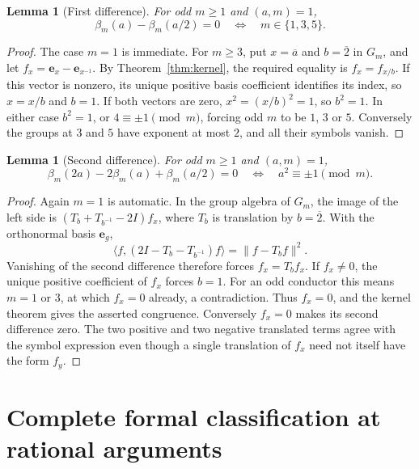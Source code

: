 \documentclass[11pt]{article}
\numberwithin{equation}{section}
\newtheorem{lemma}[theorem]{Lemma}
\theoremstyle{definition}
\theoremstyle{remark}
\newcommand{\ee}{\mathbf e}
\newcommand{\inv}{^{-1}}
\begin{document}
\begin{lemma}[First difference]\label{lem:first}
For odd $m\ge1$ and $(a,m)=1$,
\begin{equation}\label{eq:first}
 \beta_m(a)-\beta_m(a/2)=0
 \quad\Longleftrightarrow\quad m\in\{1,3,5\}.
\end{equation}
\end{lemma}
\begin{proof}
The case $m=1$ is immediate. For $m\ge3$, put $x=\overline a$ and
$b=\overline2$ in $G_m$, and let $f_x=\ee_x-\ee_{x\inv}$.
By Theorem~\ref{thm:kernel}, the required equality is
$f_x=f_{x/b}$. If this vector is nonzero, its unique positive basis
coefficient identifies its index, so $x=x/b$ and $b=1$. If both
vectors are zero, $x^2=(x/b)^2=1$, so $b^2=1$. In either case
$b^2=1$, or $4\equiv\pm1\pmod m$, forcing odd $m$ to be $1$, $3$
or $5$. Conversely the groups at $3$ and $5$ have exponent at most
$2$, and all their symbols vanish.
\end{proof}

\begin{lemma}[Second difference]\label{lem:second}
For odd $m\ge1$ and $(a,m)=1$,
\begin{equation}\label{eq:second}
 \beta_m(2a)-2\beta_m(a)+\beta_m(a/2)=0
 \quad\Longleftrightarrow\quad a^2\equiv\pm1\pmod m.
\end{equation}
\end{lemma}
\begin{proof}
Again $m=1$ is automatic. In the group algebra of $G_m$, the image of
the left side is $(T_b+T_{b\inv}-2I)f_x$, where $T_b$ is translation
by $b=\overline2$. With the orthonormal basis $\ee_g$,
\[
 \big\langle f,(2I-T_b-T_{b\inv})f\big\rangle
 =\|f-T_bf\|^2.
\]
Vanishing of the second difference therefore forces $f_x=T_bf_x$.
If $f_x\ne0$, the unique positive coefficient of $f_x$ forces $b=1$.
For an odd conductor this means $m=1$ or $3$, at which $f_x=0$
already, a contradiction. Thus $f_x=0$, and the kernel theorem gives
the asserted congruence. Conversely $f_x=0$ makes its second difference
zero. The two positive and two negative translated terms agree with
the symbol expression even though a single translation of $f_x$ need
not itself have the form $f_y$.
\end{proof}


\section{Complete formal classification at rational arguments}
\label{sec:classification}
\end{document}
